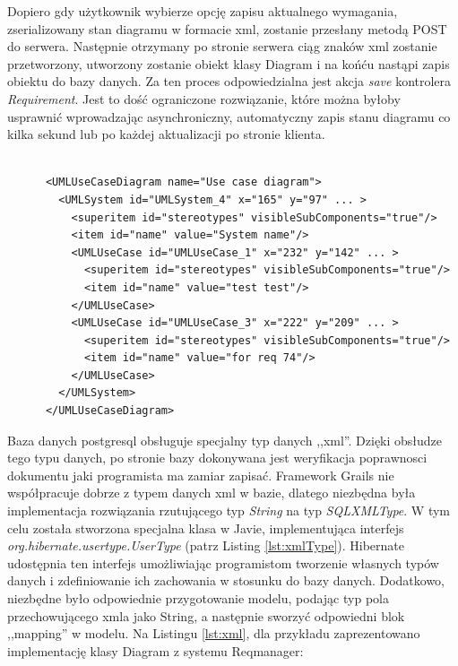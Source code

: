       Dopiero gdy użytkownik wybierze opcję zapisu aktualnego wymagania, zserializowany stan diagramu w formacie xml, zostanie przesłany metodą POST do serwera. Następnie otrzymany po stronie serwera ciąg znaków xml zostanie przetworzony, utworzony zostanie obiekt klasy Diagram i na końću nastąpi zapis obiektu do bazy danych. Za ten proces odpowiedzialna jest akcja \emph{save} kontrolera \emph{Requirement}. Jest to dość ograniczone rozwiązanie, które można byłoby usprawnić wprowadzając asynchroniczny, automatyczny zapis stanu diagramu co kilka sekund lub po każdej aktualizacji po stronie klienta.

      \begin{lstlisting}[caption={Struktura xml diagramu}, label={lst:diagramXml}]

      <UMLUseCaseDiagram name="Use case diagram">
        <UMLSystem id="UMLSystem_4" x="165" y="97" ... >
          <superitem id="stereotypes" visibleSubComponents="true"/>
          <item id="name" value="System name"/>
          <UMLUseCase id="UMLUseCase_1" x="232" y="142" ... >
            <superitem id="stereotypes" visibleSubComponents="true"/>
            <item id="name" value="test test"/>
          </UMLUseCase>
          <UMLUseCase id="UMLUseCase_3" x="222" y="209" ... >
            <superitem id="stereotypes" visibleSubComponents="true"/>
            <item id="name" value="for req 74"/>
          </UMLUseCase>
        </UMLSystem>
      </UMLUseCaseDiagram>

      \end{lstlisting}

      Baza danych postgresql obsługuje specjalny typ danych ,,xml''. Dzięki obsłudze tego typu danych, po stronie bazy dokonywana jest weryfikacja poprawnosci dokumentu jaki programista ma zamiar zapisać. Framework Grails nie współpracuje dobrze z typem danych xml w bazie, dlatego niezbędna była implementacja rozwiązania rzutującego typ \emph{String} na typ \emph{SQLXMLType}. W tym celu została stworzona specjalna klasa w Javie, implementująca interfejs \emph{org.hibernate.usertype.UserType} (patrz Listing \ref{lst:xmlType}). Hibernate udostępnia ten interfejs umożliwiając programistom tworzenie własnych typów danych i zdefiniowanie ich zachowania w stosunku do bazy danych. Dodatkowo, niezbędne było odpowiednie przygotowanie modelu, podając typ pola przechowującego xmla jako String, a następnie sworzyć odpowiedni blok ,,mapping'' w modelu. Na Listingu \ref{lst:xml}, dla przykładu zaprezentowano implementację klasy Diagram z systemu Reqmanager:
 
